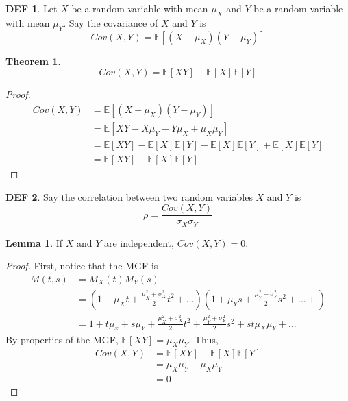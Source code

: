 \documentclass{article}
\newtheorem{theorem}{Theorem}
\theoremstyle{definition}\newtheorem{definition}{DEF}
\theoremstyle{lemma}\newtheorem{lemma}{Lemma}
\theoremstyle{corrolary}\newtheorem{corrolary}{Cor}
\begin{document}
\begin{definition}
Let $X$ be a random variable with mean $\mu_X$ and $Y$ be a random variable with mean $\mu_Y$.
Say the covariance of $X$ and $Y$ is
\begin{equation}
Cov(X,Y)=\mathbb{E}[(X-\mu_X)(Y-\mu_Y)]
\end{equation}
\end{definition}

\begin{theorem}
\begin{equation}
Cov(X,Y)=\mathbb{E}[XY]-\mathbb{E}[X]\mathbb{E}[Y]
\end{equation}
\end{theorem}
\begin{proof}
\begin{align*}
Cov(X,Y)&=\mathbb{E}[(X-\mu_X)(Y-\mu_Y)]\\
&=\mathbb{E}[XY-X\mu_Y-Y\mu_X +\mu_X\mu_Y]\\
&=\mathbb{E}[XY]-\mathbb{E}[X]\mathbb{E}[Y]-\mathbb{E}[X]\mathbb{E}[Y]+\mathbb{E}[X]\mathbb{E}[Y]\\
&=\mathbb{E}[XY]-\mathbb{E}[X]\mathbb{E}[Y]
\end{align*}
\end{proof}

\begin{definition}
Say the correlation between two random variables $X$ and $Y$ is
\begin{equation}
\rho = \frac{Cov(X,Y)}{\sigma_X \sigma_Y}
\end{equation}
\end{definition}

\begin{lemma}
If $X$ and $Y$ are independent, $Cov(X,Y)=0$.
\end{lemma}
\begin{proof}
First, notice that the MGF is
\begin{align*}
M(t,s)&=M_X(t)M_Y(s)\\
&=\left( 1 + \mu_X t + \frac{\mu_X^2 + \sigma_X^2}{2}t^2+...\right)\left(1+\mu_Ys +\frac{\mu_Y^2+\sigma_Y^2}{2}s^2+...+\right)\\
&=1+t\mu_x +s\mu_Y  + \frac{\mu_X^2 + \sigma_X^2}{2}t^2 + \frac{\mu_Y^2+\sigma_Y^2}{2}s^2+st\mu_X\mu_Y +...
\end{align*}
By properties of the MGF, $\mathbb{E}[XY]= \mu_X
\mu_Y$.
Thus,
\begin{align*}
Cov(X,Y)&=\mathbb{E}[XY]-\mathbb{E}[X]\mathbb{E}[Y]\\
&=\mu_X\mu_Y - \mu_X\mu_Y\\
&=0
\end{align*}
\end{proof}
\end{document}
